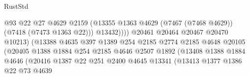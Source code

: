 \begin{lexlean}{RustStd}
\begin{coremodule}
                                                @93
                                                @22
                                                @27
                                                @4629
                                                @2159
                                                (@13355
                                                  @1363
                                                  @4629
                                                  (@7467 (@7468 @4629))
                                                  (@7418 (@7473 @1363 @22)))
                                                @13432))))
                                        @20461
                                        @20464
                                        @20467
                                        @20470
                                        @10213)
                                      (@13388
                                        @4635
                                        @397
                                        @1389
                                        @254
                                        @2185
                                        @2774
                                        @2185
                                        @4648
                                        @20105
                                        (@20405
                                          @1388
                                          @1884
                                          @254
                                          @2185
                                          @4646
                                          @2507
                                          @1892
                                          (@13408
                                            @1388
                                            @1884
                                            @4646
                                            (@20416
                                              @1387
                                              @22
                                              @251
                                              @2400
                                              @4645
                                              @13341
                                              (@13413
                                                @1377
                                                @1386
                                                @22
                                                @73
                                                @4639

\end{coremodule}
\end{lexlean}
